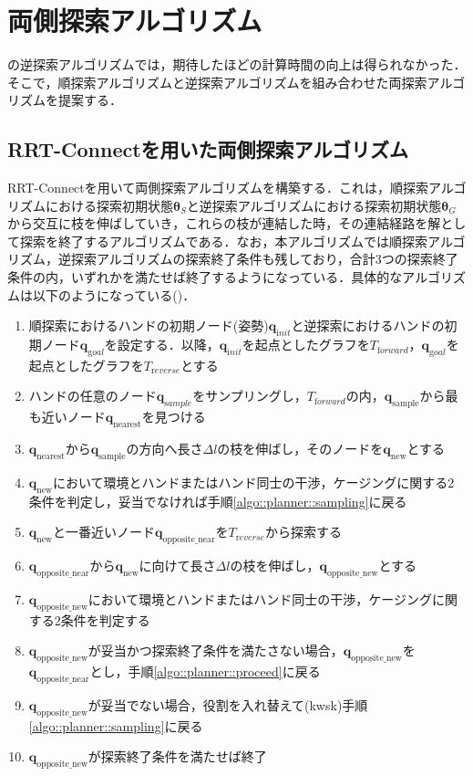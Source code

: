 \documentclass[a4paper,twoside,12pt,papersize, dvipdfmx]{iirthesis}
\begin{document}
{\section{両側探索アルゴリズム}\label{sec::planner::connect}
の逆探索アルゴリズムでは，期待したほどの計算時間の向上は得られなかった．そこで，順探索アルゴリズムと逆探索アルゴリズムを組み合わせた両探索アルゴリズムを提案する．
\subsection{RRT-Connectを用いた両側探索アルゴリズム}
RRT-Connect\cite{kuffner2000}を用いて両側探索アルゴリズムを構築する．これは，順探索アルゴリズムにおける探索初期状態$\bm {\theta}_S$と逆探索アルゴリズムにおける探索初期状態$\bm {\theta}_G$から交互に枝を伸ばしていき，これらの枝が連結した時，その連結経路を解として探索を終了するアルゴリズムである．なお，本アルゴリズムでは順探索アルゴリズム，逆探索アルゴリズムの探索終了条件も残しており，合計3つの探索終了条件の内，いずれかを満たせば終了するようになっている．具体的なアルゴリズムは以下のようになっている(\figref{})．
\begin{enumerate}
\item 順探索におけるハンドの初期ノード(姿勢)$\bm{q}_{\mathrm init}$と逆探索におけるハンドの初期ノード$\bm{q}_{\mathrm goal}$を設定する．以降，$\bm{q}_{\mathrm init}$を起点としたグラフを$T_{\mathrm forward}$，$\bm{q}_{\mathrm goal}$を起点としたグラフを$T_{\mathrm reverse}$とする
\item ハンドの任意のノード$\bm{q}_{\mathrm sample}$をサンプリングし，$T_{\mathrm forward}$の内，$\bm{q}_{\mathrm{sample}}$から最も近いノード$\bm{q}_{\mathrm{nearest}}$を見つける\label{algo::planner::sampling}
\item $\bm{q}_{\mathrm{nearest}}$から$\bm{q}_{\mathrm{sample}}$の方向へ長さ$\Delta l$の枝を伸ばし，そのノードを$\bm{q}_{\mathrm{new}}$とする
\item $\bm{q}_{\mathrm{new}}$において環境とハンドまたはハンド同士の干渉，ケージングに関する2条件を判定し，妥当でなければ手順\ref{algo::planner::sampling}に戻る
\item $\bm{q}_{\mathrm{new}}$と一番近いノード$\bm{q}_{\mathrm{opposite\_near}}$を$T_{\mathrm reverse}$から探索する\label{algo::planner::biasbegin}
\item $\bm{q}_{\mathrm{opposite\_near}}$から$\bm{q}_{\mathrm{new}}$に向けて長さ$\Delta l$の枝を伸ばし，$\bm{q}_{\mathrm{opposite\_new}}$とする\label{algo::planner::proceed}
\item $\bm{q}_{\mathrm{opposite\_new}}$において環境とハンドまたはハンド同士の干渉，ケージングに関する2条件を判定する
\item $\bm{q}_{\mathrm{opposite\_new}}$が妥当かつ探索終了条件を満たさない場合，$\bm{q}_{\mathrm{opposite\_new}}$を$\bm{q}_{\mathrm{opposite\_near}}$とし，手順\ref{algo::planner::proceed}に戻る\label{algo::planner::biasend}
\item $\bm{q}_{\mathrm{opposite\_new}}$が妥当でない場合，役割を入れ替えて(kwsk)手順\ref{algo::planner::sampling}に戻る
\item $\bm{q}_{\mathrm{opposite\_new}}$が探索終了条件を満たせば終了\label{algo::planner::goalcond}
\end{enumerate}

}
\end{document}

